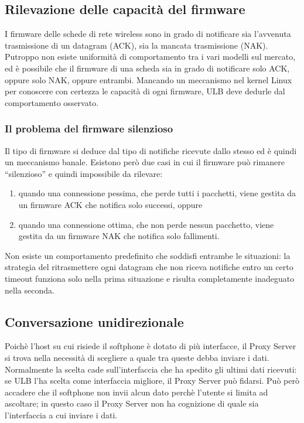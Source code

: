 \documentclass[12pt,a4paper,openright,twoside]{book}
\begin{document}
\subsection{Rilevazione delle capacità del firmware}
I firmware delle schede di rete wireless sono in grado di notificare
sia l'avvenuta trasmissione di un datagram (ACK), sia la mancata
trasmissione (NAK). Putroppo non esiste uniformità di comportamento
tra i vari modelli sul mercato, ed è possibile che il firmware di una
scheda sia in grado di notificare solo ACK, oppure solo NAK, oppure
entrambi. Mancando un meccanismo nel kernel Linux per conoscere con
certezza le capacità di ogni firmware, ULB deve dedurle dal
comportamento osservato.

\subsubsection{Il problema del firmware silenzioso}
Il tipo di firmware si deduce dal tipo di notifiche ricevute dallo
stesso ed è quindi un meccanismo banale. Esistono però due casi in cui
il firmware può rimanere ``silenzioso'' e quindi impossibile da
rilevare:
\begin{enumerate}
\item quando una connessione pessima, che perde tutti i pacchetti,
  viene gestita da un firmware ACK che notifica solo successi, oppure
\item quando una connessione ottima, che non perde nessun pacchetto,
  viene gestita da un firmware NAK che notifica solo fallimenti.
\end{enumerate}
Non esiste un comportamento predefinito che soddisfi entrambe le
situazioni: la strategia del ritrasmettere ogni datagram che non
riceva notifiche entro un certo timeout funziona solo nella prima
situazione e risulta completamente inadeguato nella seconda.

\subsection{Conversazione unidirezionale}
Poichè l'host su cui risiede il softphone è dotato di più interfacce,
il Proxy Server si trova nella necessità di scegliere a quale tra
queste debba inviare i dati. Normalmente la scelta cade
sull'interfaccia che ha spedito gli ultimi dati ricevuti: se ULB l'ha
scelta come interfaccia migliore, il Proxy Server può fidarsi. Può
però accadere che il softphone non invii alcun dato perchè l'utente si
limita ad ascoltare; in questo caso il Proxy Server non ha cognizione
di quale sia l'interfaccia a cui inviare i dati.
\end{document}
